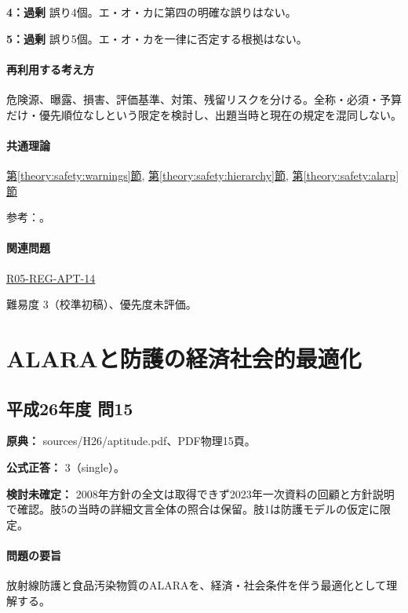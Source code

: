 \noindent\textbf{4：過剰} 誤り4個。エ・オ・カに第四の明確な誤りはない。\par

\noindent\textbf{5：過剰} 誤り5個。エ・オ・カを一律に否定する根拠はない。\par

\paragraph{再利用する考え方} 危険源、曝露、損害、評価基準、対策、残留リスクを分ける。全称・必須・予算だけ・優先順位なしという限定を検討し、出題当時と現在の規定を混同しない。

\paragraph{共通理論} \hyperref[theory:safety:warnings]{第\ref*{theory:safety:warnings}節}, \hyperref[theory:safety:hierarchy]{第\ref*{theory:safety:hierarchy}節}, \hyperref[theory:safety:alarp]{第\ref*{theory:safety:alarp}節}

\par 参考：\cite{saf_ra2006,saf_guide51,saf_parliament2006}。

\paragraph{関連問題} \hyperref[q:r05-reg-apt-14]{R05-REG-APT-14}

\par 難易度 3（校準初稿）、優先度未評価。

\section{ALARAと防護の経済社会的最適化}

\subsection{平成26年度 問15}
\label{q:h26-reg-apt-15}

\noindent\textbf{原典：} sources/H26/aptitude.pdf、PDF物理15頁。

\textbf{公式正答：} 3（single）。

\par\textbf{検討未確定：} 2008年方針の全文は取得できず2023年一次資料の回顧と方針説明で確認。肢5の当時の詳細文言全体の照合は保留。肢1は防護モデルの仮定に限定。

\paragraph{問題の要旨} 放射線防護と食品汚染物質のALARAを、経済・社会条件を伴う最適化として理解する。

